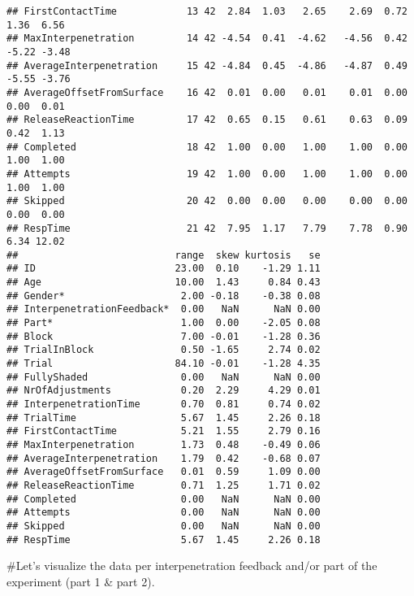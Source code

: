 \documentclass[
]{article}
\begin{document}
\begin{verbatim}
## FirstContactTime            13 42  2.84  1.03   2.65    2.69  0.72  1.36  6.56
## MaxInterpenetration         14 42 -4.54  0.41  -4.62   -4.56  0.42 -5.22 -3.48
## AverageInterpenetration     15 42 -4.84  0.45  -4.86   -4.87  0.49 -5.55 -3.76
## AverageOffsetFromSurface    16 42  0.01  0.00   0.01    0.01  0.00  0.00  0.01
## ReleaseReactionTime         17 42  0.65  0.15   0.61    0.63  0.09  0.42  1.13
## Completed                   18 42  1.00  0.00   1.00    1.00  0.00  1.00  1.00
## Attempts                    19 42  1.00  0.00   1.00    1.00  0.00  1.00  1.00
## Skipped                     20 42  0.00  0.00   0.00    0.00  0.00  0.00  0.00
## RespTime                    21 42  7.95  1.17   7.79    7.78  0.90  6.34 12.02
##                           range  skew kurtosis   se
## ID                        23.00  0.10    -1.29 1.11
## Age                       10.00  1.43     0.84 0.43
## Gender*                    2.00 -0.18    -0.38 0.08
## InterpenetrationFeedback*  0.00   NaN      NaN 0.00
## Part*                      1.00  0.00    -2.05 0.08
## Block                      7.00 -0.01    -1.28 0.36
## TrialInBlock               0.50 -1.65     2.74 0.02
## Trial                     84.10 -0.01    -1.28 4.35
## FullyShaded                0.00   NaN      NaN 0.00
## NrOfAdjustments            0.20  2.29     4.29 0.01
## InterpenetrationTime       0.70  0.81     0.74 0.02
## TrialTime                  5.67  1.45     2.26 0.18
## FirstContactTime           5.21  1.55     2.79 0.16
## MaxInterpenetration        1.73  0.48    -0.49 0.06
## AverageInterpenetration    1.79  0.42    -0.68 0.07
## AverageOffsetFromSurface   0.01  0.59     1.09 0.00
## ReleaseReactionTime        0.71  1.25     1.71 0.02
## Completed                  0.00   NaN      NaN 0.00
## Attempts                   0.00   NaN      NaN 0.00
## Skipped                    0.00   NaN      NaN 0.00
## RespTime                   5.67  1.45     2.26 0.18
\end{verbatim}

\#Let's visualize the data per interpenetration feedback and/or part of
the experiment (part 1 \& part 2).
\end{document}
